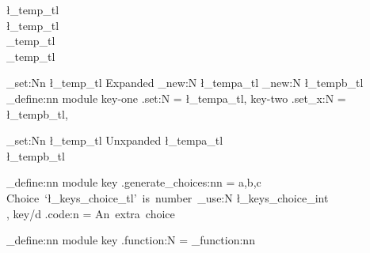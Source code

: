 \documentclass{article}
\begin{document}
\begingroup
{}
\l_temp_tl\\
\endgroup
\l_temp_tl\\

\begingroup
{}
\g_temp_tl\\
\endgroup
\g_temp_tl\\
\ExplSyntaxOff

\ExplSyntaxOn
\tl_set:Nn \l_temp_tl {Expanded}
\tl_new:N \l_tempa_tl 
\tl_new:N \l_tempb_tl 
\keys_define:nn { module } {
  key-one .set:N   = \l_tempa_tl,
  key-two .set_x:N = \l_tempb_tl,
}

\tl_set:Nn \l_temp_tl {Unxpanded}
\l_tempa_tl\\
\l_tempb_tl\\

\ExplSyntaxOff

\ExplSyntaxOn
\keys_define:nn { module } {
  key .generate_choices:nn = {a,b,c} {
    Choice~`\l_keys_choice_tl'~is~number~\int_use:N \l_keys_choice_int\\
  },
  key/d .code:n = An~extra~choice \\
}
\ExplSyntaxOff


\ExplSyntaxOn
\keys_define:nn { module } {
  key .function:N = \module_function:nn
}
\ExplSyntaxOff
\end{document}
